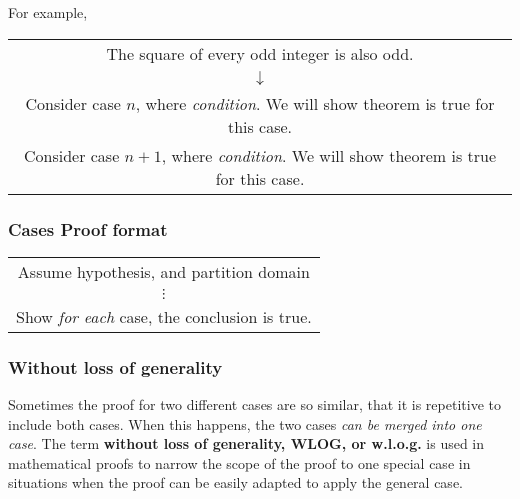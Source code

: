 For example,
\begin{center}
  \begin{tabular}{c}
    The square of every odd integer is also odd.                                             \\
    $\downarrow$                                                                             \\
    Consider case $n$, where \textit{condition}. We will show theorem is true for this case. \\
    Consider case $n+1$, where \textit{condition}. We will show theorem is true for this case.
  \end{tabular}
\end{center}
\subsubsection*{Cases Proof format}
\begin{center}
  \begin{tabular}{|c|}
    \hline
    Assume hypothesis, and partition domain              \\
    $\vdots$                                             \\
    Show \textit{for each} case, the conclusion is true. \\
    \hline
  \end{tabular}
\end{center}
\subsubsection*{Without loss of generality}
Sometimes the proof for two different cases are so similar, that it is repetitive to include both cases.
When this happens, the two cases \textit{can be merged into one case}.
The term \textbf{without loss of generality, WLOG, or w.l.o.g.} is used in mathematical proofs to
narrow the scope of the proof to one special case in situations when the proof can be easily adapted to
apply the general case.
